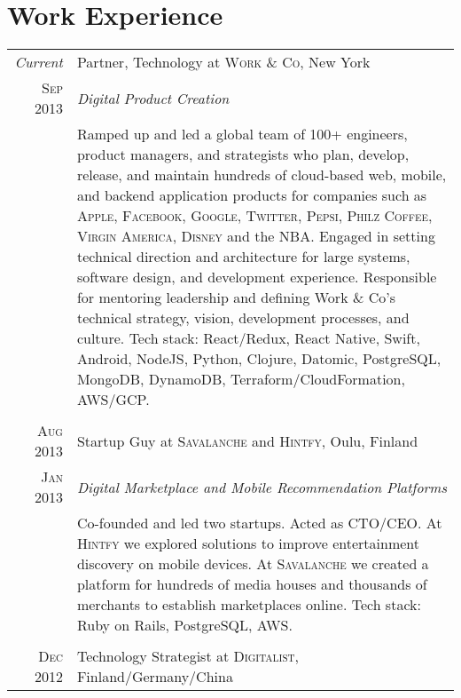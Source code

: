 \documentclass[a4paper,10pt]{article}
\begin{document}
\section{Work Experience}
\begin{tabular}{r|p{11cm}}
  \emph{Current} & Partner, Technology at \textsc{Work \& Co}, New York \\

  \textsc{Sep 2013} & \emph{Digital Product Creation}\\

  &\footnotesize{Ramped up and led a global team of 100+ engineers,
    product managers, and strategists who plan, develop, release, and
    maintain hundreds of cloud-based web, mobile, and backend
    application products for companies such as \textsc{Apple},
    \textsc{Facebook}, \textsc{Google}, \textsc{Twitter},
    \textsc{Pepsi}, \textsc{Philz Coffee}, \textsc{Virgin America},
    \textsc{Disney} and the \textsc{NBA}. Engaged in setting technical
    direction and architecture for large systems, software design, and
    development experience. Responsible for mentoring leadership and
    defining Work \& Co's technical strategy, vision, development
    processes, and culture. Tech stack: React/Redux, React Native,
    Swift, Android, NodeJS, Python, Clojure, Datomic, PostgreSQL,
    MongoDB, DynamoDB, Terraform/CloudFormation, AWS/GCP.}\\

  \multicolumn{2}{c}{}\\

  \textsc{Aug 2013} & Startup Guy at \textsc{Savalanche} and \textsc{Hintfy}, Oulu, Finland \\

  \textsc{Jan 2013} & \emph{Digital Marketplace and Mobile Recommendation Platforms} \\

  &\footnotesize{Co-founded and led two startups. Acted as
    \textsc{CTO/CEO}. At \textsc{Hintfy} we explored solutions to
    improve entertainment discovery on mobile devices. At
    \textsc{Savalanche} we created a platform for hundreds of media
    houses and thousands of merchants to establish marketplaces
    online. Tech stack: Ruby on Rails, PostgreSQL, AWS.}\\

  \multicolumn{2}{c}{}\\

  \textsc{Dec 2012} & Technology Strategist at \textsc{Digitalist},
  Finland/Germany/China \\


\end{tabular}
\end{document}
